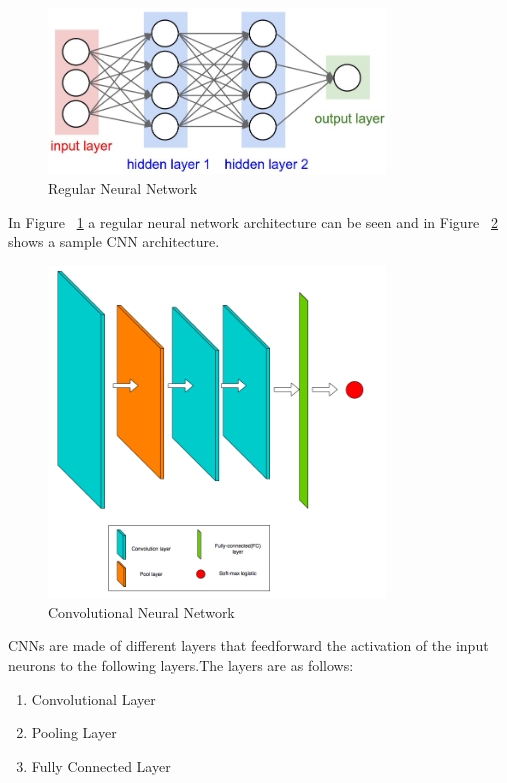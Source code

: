 \begin{figure}[t]
\caption{Regular Neural Network}
\label{figregnn}
\centering
\includegraphics[width=0.8\textwidth]{Figures/regnn}
\end{figure}

In Figure ~\ref{figregnn} a regular neural network architecture can be seen and in Figure ~\ref{figconvnet} shows a sample CNN architecture. 

\begin{figure}[t]
\caption{Convolutional Neural Network}
\label{figconvnet}
\centering
\includegraphics[width=0.8\textwidth]{Figures/convnet}
\end{figure}

CNNs are made of different layers that feedforward the activation of the input neurons to the following layers.The layers are as follows:

\begin{enumerate}
    \item Convolutional Layer
    \item Pooling Layer
    \item Fully Connected Layer
\end{enumerate}

